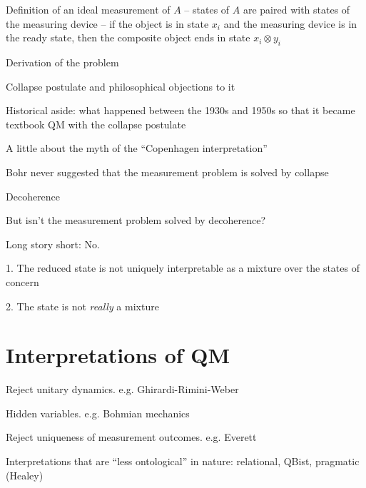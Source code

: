 \item Definition of an ideal measurement of $A$
  -- states of $A$ are paired with states of the measuring device
  -- if the object is in state $x_i$ and the measuring device is in
  the ready state, then the composite object ends in state $x_i\otimes y_i$
\item Derivation of the problem
\item Collapse postulate and philosophical objections to it 
\item Historical aside: what happened between the 1930s and 1950s so
  that it became textbook QM with the collapse postulate
\item A little about the myth of the ``Copenhagen interpretation''
\item Bohr never suggested that the measurement problem is solved by
  collapse

\begin{frame}{Decoherence}

  But isn't the measurement problem solved by decoherence?

  Long story short: No.

  1. The reduced state is not uniquely interpretable as a mixture over
  the states of concern

  2. The state is not \emph{really} a mixture

\end{frame}
 

\section{Interpretations of QM}

\item Reject unitary dynamics. e.g. Ghirardi-Rimini-Weber
\item Hidden variables. e.g. Bohmian mechanics
\item Reject uniqueness of measurement outcomes. e.g. Everett
\item Interpretations that are ``less ontological'' in nature:
  relational, QBist, pragmatic (Healey)

